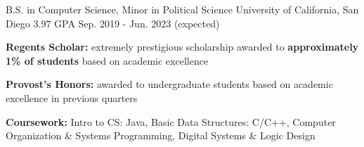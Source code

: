

\begin{cventries}

    \cventry
    {B.S. in Computer Science, Minor in Political Science} %
    {University of California, San Diego} %
    {3.97 GPA} %
    {Sep. 2019 - Jun. 2023 (expected)} %
    {
      \begin{cvitems} %
        \item {\textbf{Regents Scholar:} extremely prestigious scholarship awarded to \textbf{approximately 1\% of students} based on academic excellence}
        \item {\textbf{Provost's Honors:} awarded to undergraduate students based on academic excellence in previous quarters}
        \item {\textbf{Coursework:} Intro to CS: Java, Basic Data Structures: C/C++, Computer Organization \& Systems Programming, Digital Systems \& Logic Design}
      \end{cvitems}
    }

\end{cventries}
